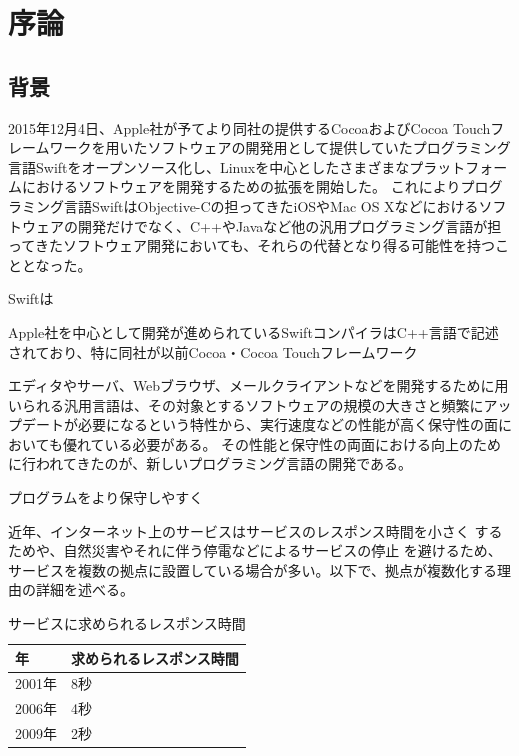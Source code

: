 \chapter{序論}
\label{introduction}

\section{背景}
\label{introduction:background}

2015年12月4日、Apple社が予てより同社の提供するCocoaおよびCocoa Touchフレームワークを用いたソフトウェアの開発用として提供していたプログラミング言語Swiftをオープンソース化し、Linuxを中心としたさまざまなプラットフォームにおけるソフトウェアを開発するための拡張を開始した。
これによりプログラミング言語SwiftはObjective-Cの担ってきたiOSやMac OS Xなどにおけるソフトウェアの開発だけでなく、C++やJavaなど他の汎用プログラミング言語が担ってきたソフトウェア開発においても、それらの代替となり得る可能性を持つこととなった。

Swiftは

Apple社を中心として開発が進められているSwiftコンパイラはC++言語で記述されており、特に同社が以前Cocoa・Cocoa Touchフレームワーク

エディタやサーバ、Webブラウザ、メールクライアントなどを開発するために用いられる汎用言語は、その対象とするソフトウェアの規模の大きさと頻繁にアップデートが必要になるという特性から、実行速度などの性能が高く保守性の面においても優れている必要がある。
その性能と保守性の両面における向上のために行われてきたのが、新しいプログラミング言語の開発である。

プログラムをより保守しやすく

近年、インターネット上のサービスはサービスのレスポンス時間を小さく
するためや、自然災害やそれに伴う停電などによるサービスの停止
を避けるため、サービスを複数の拠点に設置している場合が多い。以下で、拠点が複数化する理由の詳細を述べる。

\begin{table}[tb]
	\begin{center}
		\caption{サービスに求められるレスポンス時間}
		\begin{tabular}{|l|l|}
			\hline
				年 & 求められるレスポンス時間 \\
			\hline
				2001年 & 8秒 \\
				2006年 & 4秒 \\
				2009年 & 2秒 \\
			\hline
		\end{tabular}
		\label{table:responsetime}
	\end{center}
\end{table}

